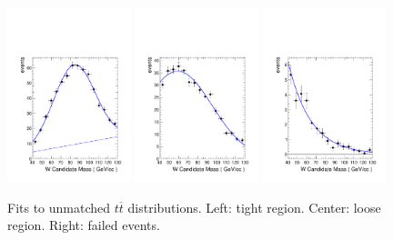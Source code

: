 \begin{figure}[h!]
\centering
                \includegraphics[width=0.32\textwidth]{EXO-12-024/figs/WtagSF/UT.pdf}
                \includegraphics[width=0.32\textwidth]{EXO-12-024/figs/WtagSF/UL.pdf}
                \includegraphics[width=0.32\textwidth]{EXO-12-024/figs/WtagSF/UF.pdf}
\caption{Fits to unmatched $t\overline{t}$ distributions. Left: tight region. Center: loose region. Right: failed events.}\label{fig:fitsunmatched}
\end{figure}

